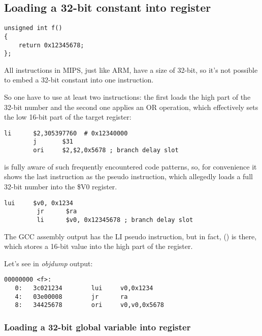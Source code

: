 ﻿\subsection{Loading a 32-bit constant into register}
\label{MIPS_big_constants}

\begin{lstlisting}[style=customc]
unsigned int f()
{
	return 0x12345678;
};
\end{lstlisting}

All instructions in MIPS, just like ARM, have a size of 32-bit, so it's not possible to
embed a 32-bit constant into one instruction.

So one have to use at least two instructions: 
the first loads the high part of the 32-bit number and the second
one applies an OR operation, which effectively sets the low 16-bit part of the target register:

\begin{lstlisting}[caption=GCC 4.4.5 -O3 (\assemblyOutput),style=customasmMIPS]
        li      $2,305397760  # 0x12340000
        j       $31
        ori     $2,$2,0x5678 ; branch delay slot
\end{lstlisting}

\IDA is fully aware of such frequently encountered code patterns, 
so, for convenience it shows the last  instruction as the  pseudo instruction,
which allegedly loads a full 32-bit number into the \$V0 register.


\begin{lstlisting}[caption=GCC 4.4.5 -O3 (IDA),style=customasmMIPS]
         lui     $v0, 0x1234
         jr      $ra
         li      $v0, 0x12345678 ; branch delay slot
\end{lstlisting}

The GCC assembly output has the LI pseudo instruction, but in fact,  () is there,
which stores a 16-bit value into the high part of the register.

Let's see in \emph{objdump} output:

\begin{lstlisting}[caption=objdump,style=customasmMIPS]
00000000 <f>:
   0:   3c021234        lui     v0,0x1234
   4:   03e00008        jr      ra
   8:   34425678        ori     v0,v0,0x5678
\end{lstlisting}

\subsubsection{Loading a 32-bit global variable into register}

